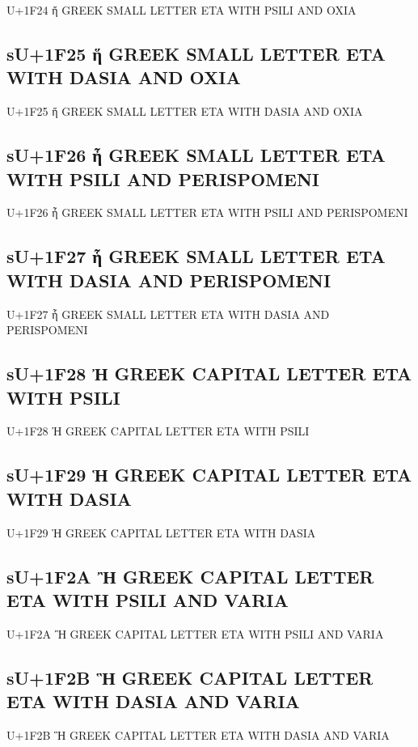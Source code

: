 U+1F24 ἤ GREEK SMALL LETTER ETA WITH PSILI AND OXIA

\subsection{sU+1F25 ἥ GREEK SMALL LETTER ETA WITH DASIA AND OXIA}

U+1F25 ἥ GREEK SMALL LETTER ETA WITH DASIA AND OXIA

\subsection{sU+1F26 ἦ GREEK SMALL LETTER ETA WITH PSILI AND PERISPOMENI}

U+1F26 ἦ GREEK SMALL LETTER ETA WITH PSILI AND PERISPOMENI

\subsection{sU+1F27 ἧ GREEK SMALL LETTER ETA WITH DASIA AND PERISPOMENI}

U+1F27 ἧ GREEK SMALL LETTER ETA WITH DASIA AND PERISPOMENI

\subsection{sU+1F28 Ἠ GREEK CAPITAL LETTER ETA WITH PSILI}

U+1F28 Ἠ GREEK CAPITAL LETTER ETA WITH PSILI

\subsection{sU+1F29 Ἡ GREEK CAPITAL LETTER ETA WITH DASIA}

U+1F29 Ἡ GREEK CAPITAL LETTER ETA WITH DASIA

\subsection{sU+1F2A Ἢ GREEK CAPITAL LETTER ETA WITH PSILI AND VARIA}

U+1F2A Ἢ GREEK CAPITAL LETTER ETA WITH PSILI AND VARIA

\subsection{sU+1F2B Ἣ GREEK CAPITAL LETTER ETA WITH DASIA AND VARIA}

U+1F2B Ἣ GREEK CAPITAL LETTER ETA WITH DASIA AND VARIA

